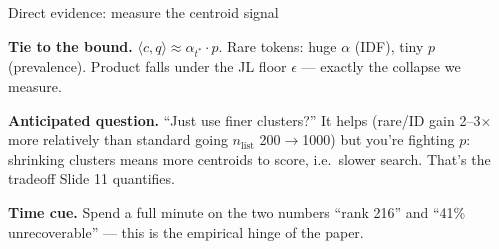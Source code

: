 \begin{frame}{Direct evidence: measure the centroid signal}
{  \textbf{Tie to the bound.} $\langle c,q\rangle \approx \alpha_{t^*}\cdot p$.
  Rare tokens: huge $\alpha$ (IDF), tiny $p$ (prevalence). Product falls
  under the JL floor $\epsilon$ --- exactly the collapse we measure.

  \textbf{Anticipated question.} ``Just use finer clusters?'' It helps
  (rare/ID gain 2--3$\times$ more relatively than standard going
  $n_{\text{list}}$ 200$\to$1000) but you're fighting $p$: shrinking clusters
  means more centroids to score, i.e.\ slower search. That's the
  tradeoff Slide 11 quantifies.

  \textbf{Time cue.} Spend a full minute on the two numbers ``rank 216''
  and ``41\% unrecoverable'' --- this is the empirical hinge of the paper.
  }
\end{frame}

